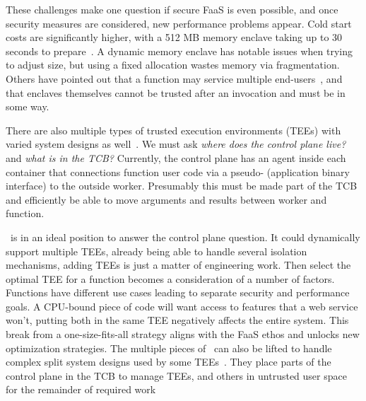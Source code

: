 These challenges make one question if secure FaaS is even possible, and once security measures are considered, new performance problems appear.
Cold start costs are significantly higher, with a 512 MB memory enclave taking up to 30 seconds to prepare~\cite{trach2019clemmys}.
A dynamic memory enclave has notable issues when trying to adjust size, but using a fixed allocation wastes memory via fragmentation.
Others have pointed out that a function may service multiple end-users~\cite{kim2023cryonics,zhao2023reusable}, and that enclaves themselves cannot be trusted after an invocation and must be  in some way.

There are also multiple types of trusted execution environments (TEEs) with varied system designs as well~\cite{arnautov2016scone,wang2022virtee,tsai2017graphene,jia2022hyperenclave}.
We must ask \emph{where does the control plane live?} and \emph{what is in the TCB?}
Currently, the control plane has an agent inside each container that connections function user code via a pseudo- (application binary interface) to the outside worker.
Presumably this must be made part of the TCB and efficiently be able to move arguments and results between worker and function.

\sysname~is in an ideal position to answer the control plane question.
It could dynamically support multiple TEEs, already being able to handle several isolation mechanisms, adding TEEs is just a matter of engineering work.
Then select the optimal TEE for a function becomes a consideration of a number of factors.
Functions have different use cases leading to separate security and performance goals.
A CPU-bound piece of code will want access to features that a web service won't, putting both in the same TEE negatively affects the entire system. 
This break from a one-size-fits-all strategy aligns with the FaaS ethos and unlocks new optimization strategies.
The multiple pieces of \sysname~can also be lifted to handle complex split system designs used by some TEEs~\cite{tsai2017graphene,jia2022hyperenclave}.
They place parts of the control plane in the TCB to manage TEEs, and others in untrusted user space for the remainder of required work
